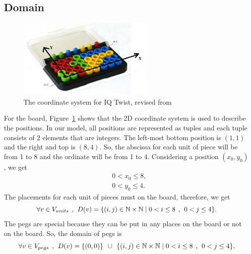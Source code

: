 \subsection{Domain}
\begin{figure}[htbp]
\centering
\includegraphics[width=0.6\textwidth]{figs/IQtwistboard.jpg}
\caption{The coordinate system for IQ Twist, revised from~\cite{r22}}
    \label{fig:coordinate}
\end{figure}
For the board, Figure~\ref{fig:coordinate} shows that the 2D coordinate system is used to describe the positions. In our model, all positions are represented as tuples and each tuple consists of 2 elements that are integers. The left-most bottom position is $(1,1)$ and the right and top is $(8,4)$. So, the abscissa for each unit of piece will be from 1 to 8 and the ordinate will be from 1 to 4. Considering a position $(x_{0},y_{0})$, we get
\begin{equation}
\begin{aligned}
&0<x_{0} \leq 8,\\
&0<y_{0} \leq 4.
\end{aligned}
\end{equation}
The placements for each unit of pieces must on the board, therefore, we get
\begin{equation}
\forall  v \in V_{units} \hspace{1ex},\hspace{1ex} D(v)=\{(i,j) \in \mathbb{N} \times \mathbb{N}	\mid  0<i \leq 8 \hspace{1ex} , \hspace{1ex} 0<j \leq 4\}.\\
\end{equation}
The pegs are special because they can be put in any places on the board or not on the board. So, the domain of pegs is
\begin{equation}
\forall  v \in V_{pegs} \hspace{1ex},\hspace{1ex} D(v)=\{(0,0)\} \hspace{1ex} \cup \hspace{1ex}\{(i,j) \in \mathbb{N} \times \mathbb{N}\mid  0<i \leq 8 \hspace{1ex} , \hspace{1ex} 0<j \leq 4\}.
\end{equation}
